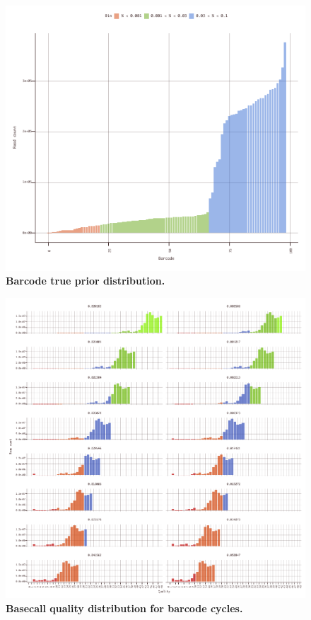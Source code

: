 \documentclass[10pt,twocolumn]{article}
\begin{document}
\begin{figure}[htbp]
\centering
\includegraphics[keepaspectratio,scale=1]{../plot/13_barcode_distribution}
\caption{\footnotesize{\textbf{Barcode true prior distribution. } } }
\label{fig:13}
\end{figure}

\begin{figure}[htbp]
\centering
\includegraphics[keepaspectratio,scale=1]{../plot/14_quality_distribution_by_rate_0550}
\caption{\footnotesize{\textbf{Basecall quality distribution for barcode cycles. } } }
\label{fig:14}
\end{figure}
\end{document}
